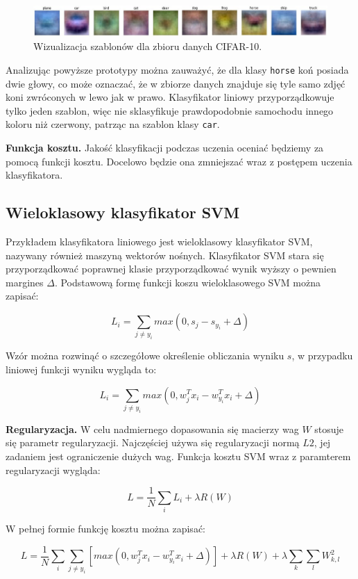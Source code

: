 \documentclass[a4paper,11pt, notitlepage, twosides, openany ]{report}
\begin{document}
	\begin{figure}[h]
		\centering
		\includegraphics[width=1 \textwidth]{templates.jpg}
		\caption{Wizualizacja szablonów dla zbioru danych CIFAR-10.}
		\label{templates}
	\end{figure}

	Analizując powyższe prototypy można zauważyć, że dla klasy \texttt{horse} koń posiada dwie głowy, co może oznaczać, że w zbiorze danych znajduje się tyle samo zdjęć koni zwróconych w lewo jak w prawo. Klasyfikator liniowy przyporządkowuje tylko jeden szablon, więc nie sklasyfikuje prawdopodobnie samochodu innego koloru niż czerwony, patrząc na szablon klasy \texttt{car}.

	\textbf{Funkcja kosztu.} Jakość klasyfikacji podczas uczenia oceniać będziemy za pomocą funkcji kosztu. Docelowo będzie ona zmniejszać wraz z postępem uczenia klasyfikatora.

	\subsection{Wieloklasowy klasyfikator SVM}
	Przykładem klasyfikatora liniowego jest wieloklasowy klasyfikator SVM, nazywany również maszyną wektorów nośnych. Klasyfikator SVM stara się przyporządkować poprawnej klasie przyporządkować wynik wyższy o pewnien margines $\Delta$. Podstawową formę funkcji koszu wieloklasowego SVM można zapisać:
	
	$$
		L_i = \sum_{j\neq y_i} max(0, s_j - s_{y_i} + \Delta) 
	$$

	Wzór można rozwinąć o szczegółowe określenie obliczania wyniku $s$, w przypadku liniowej funkcji wyniku wygląda to:

	$$
		L_i = \sum_{j\neq y_i} max(0, w^T_jx_i - w^T_{y_i}x_i + \Delta) 
	$$

	\textbf{Regularyzacja.} W celu nadmiernego dopasowania się macierzy wag $W$ stosuje się parametr regularyzacji. Najczęściej używa się regularyzacji normą $L2$, jej zadaniem jest ograniczenie dużych wag. Funkcja kosztu SVM wraz z paramterem regularyzacji wygląda:

	$$
		L = \frac{1}{N} \sum_{i} L_i + \lambda R(W)
	$$

	W pełnej formie funkcję kosztu można zapisać:

	$$
		L = \frac{1}{N} \sum_{i} \sum_{j\neq y_i}[max(0, w^T_jx_i - w^T_{y_i}x_i + \Delta) ] + \lambda R(W) + \lambda\sum_{k}\sum_{l} W^2_{k,l}
	$$
\end{document}
